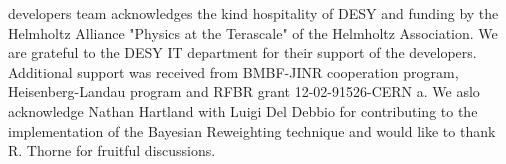 \begin{acknowledgements}
\fitter developers team acknowledges the kind hospitality of DESY 
and funding by the Helmholtz Alliance "Physics at the Terascale" of the Helmholtz Association.
We are grateful to the DESY IT department for their support of the \fitter  developers.
Additional support was received from BMBF-JINR cooperation program,
Heisenberg-Landau program and RFBR grant 12-02-91526-CERN a.
We aslo acknowledge Nathan Hartland with Luigi Del Debbio for contributing to the 
implementation of the Bayesian Reweighting technique and
would like to thank R. Thorne for fruitful discussions.
\end{acknowledgements}












